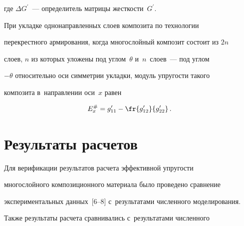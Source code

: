      


     \vspace*{-3pt}


     


     \noindent


где $\Delta G^\prime$~--- определитель матрицы жест\-кости~$G^\prime$.





     При укладке однонаправленных слоев композита по технологии 


перекрестного армирования, когда многослойный композит состоит из $2n$ 


слоев, $n$ из которых уложены под углом~$\theta$ и~$n$~слоев~--- под углом  


$-\theta$ относительно оси симметрии укладки, модуль упругости такого 


композита в~направлении оси~$x$ равен


     \begin{equation}


     E_x^\# = g_{11}^\prime -\fr{g^\prime_{12}}{g_{22}^\prime}\,.


     \label{e4-ab}


     \end{equation}


     


     \vspace*{-15pt}





\section{Результаты расчетов}





     \vspace*{-5pt}





     


     Для верификации результатов расчета эффективной упругости 


многослойного композиционного материала было проведено сравнение 


экспериментальных данных~[6--8] с~результатами численного моделирования. 


Также результаты расчета сравнивались с~результатами численного 


